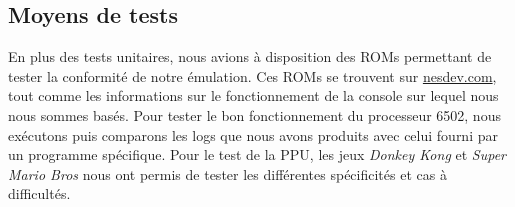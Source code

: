 \subsection{Moyens de tests}

En plus des tests unitaires, nous avions à disposition des ROMs permettant de tester la conformité de notre émulation. Ces ROMs se trouvent sur \url{nesdev.com}, tout comme les informations sur le fonctionnement de la console sur lequel nous nous sommes basés. Pour tester le bon fonctionnement du processeur 6502, nous exécutons puis comparons les logs que nous avons produits avec celui fourni par un programme spécifique. Pour le test de la PPU, les jeux \emph{Donkey Kong} et \emph{Super Mario Bros} nous ont permis de tester les différentes spécificités et cas à difficultés.
